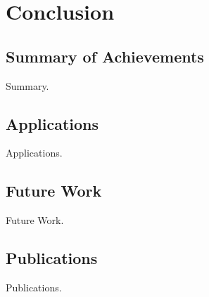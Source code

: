 
\chapter{Conclusion}

\label{ch:conclusions}

\section{Summary of Achievements}

Summary.

\section{Applications}

Applications.

\section{Future Work}

Future Work.

\section{Publications}

Publications.